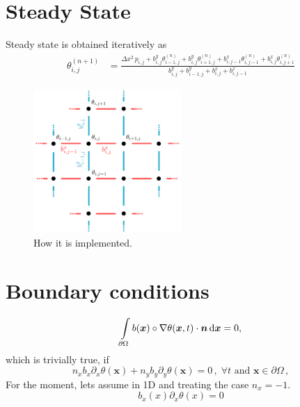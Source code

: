 \documentclass[notitlepage]{revtex4-2}
\begin{document}
\section{Steady State}
Steady state is obtained iteratively as
\begin{align}
\theta_{i,j}^{(n+1)} &= \frac{\Delta x^2\,p_{i,j} + b^y_{i,j}\theta_{i-1,j}^{(n)}
+b^y_{i,j}\theta_{i+1,j}^{(n)}+b^x_{i,j-1}\theta_{i,j-1}^{(n)}
+b^x_{i,j}\theta_{i,j+1}^{(n)}}
{b^y_{i,j}+b^y_{i-1,j}+b^x_{i,j}+b^x_{i,j-1}}
\end{align}


\begin{figure}
\includegraphics[width=0.5\textwidth]{figures/lattice_implementation.pdf}
\caption{How it is implemented.}
\end{figure}

\section{Boundary conditions}
\begin{equation}
\intop_{\partial \Omega}b(\bm x)\circ\nabla \theta(\bm x,t)\cdot\bm n\, {\rm d}\bm x  = 0 \\,
\end{equation}
which is trivially true, if
\begin{equation}
n_xb_x\partial_x \theta(\bm x) + n_yb_y\partial_y \theta(\bm x) = 0\,,\; \forall t \text{ and } \bm x \in \partial \Omega \,,
\end{equation}
For the moment, lets assume in 1D and treating the case $n_x=-1$.
\begin{equation}
b_x(x)\partial_x \theta(x) = 0
\end{equation}
\end{document}
